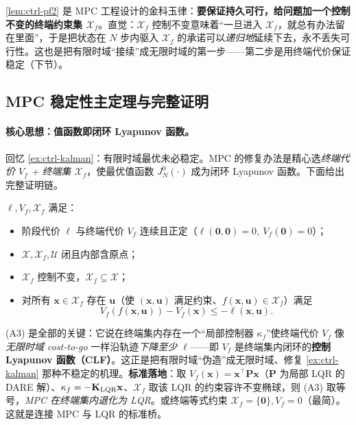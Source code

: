 \begin{insight}
\cref{lem:ctrl-pf2} 是 MPC 工程设计的金科玉律：\textbf{要保证持久可行，给问题加一个控制不变的终端约束集 $\mathcal{X}_f$}。直觉：$\mathcal{X}_f$ 控制不变意味着“一旦进入 $\mathcal{X}_f$，就总有办法留在里面”，于是把状态在 $N$ 步内驱入 $\mathcal{X}_f$ 的承诺可以\emph{递归地}延续下去，永不丢失可行性。这也是把有限时域“接续”成无限时域的第一步——第二步是用终端代价保证稳定（下节）。
\end{insight}

\subsection{MPC 稳定性主定理与完整证明}
\label{sec:ctrl-mpc-stability}

\paragraph{核心思想：值函数即闭环 Lyapunov 函数。}
回忆 \cref{ex:ctrl-kalman}：有限时域最优未必稳定。MPC 的修复办法是精心选\emph{终端代价 $V_f$ + 终端集 $\mathcal{X}_f$}，使最优值函数 $J_N^0(\cdot)$ 成为闭环 Lyapunov 函数\cite{rawlings2020mpc,borrelli2017predictive}。下面给出完整证明链。

\begin{definition}
\label{def:ctrl-mpc-asm}
$\ell,V_f,\mathcal{X}_f$ 满足\cite{rawlings2020mpc,borrelli2017predictive}：
\begin{itemize}
  \item[(A0)] 阶段代价 $\ell$ 与终端代价 $V_f$ 连续且正定（$\ell(\mathbf{0},\mathbf{0})=0,\ V_f(\mathbf{0})=0$）；
  \item[(A1)] $\mathcal{X},\mathcal{X}_f,\mathcal{U}$ 闭且内部含原点；
  \item[(A2)] $\mathcal{X}_f$ 控制不变，$\mathcal{X}_f\subseteq\mathcal{X}$；
  \item[(A3)（终端代价下降 / CLF 条件）] 对所有 $\mathbf{x}\in\mathcal{X}_f$ 存在 $\mathbf{u}$（使 $(\mathbf{x},\mathbf{u})$ 满足约束、$f(\mathbf{x},\mathbf{u})\in\mathcal{X}_f$）满足
  \begin{equation}
    V_f(f(\mathbf{x},\mathbf{u}))-V_f(\mathbf{x})\le-\ell(\mathbf{x},\mathbf{u}).
    \label{eq:ctrl-mpc-A3}
  \end{equation}
\end{itemize}
\end{definition}

\begin{insight}
(A3) 是全部的关键：它说在终端集内存在一个“局部控制器 $\kappa_f$”使终端代价 $V_f$ 像\emph{无限时域 cost-to-go} 一样沿轨迹\emph{下降至少 $\ell$}——即 $V_f$ 是终端集内闭环的\textbf{控制 Lyapunov 函数（CLF）}。这正是把有限时域“伪造”成无限时域、修复 \cref{ex:ctrl-kalman} 那种不稳定的机理。\textbf{标准落地}：取 $V_f(\mathbf{x})=\mathbf{x}^\top\mathbf{P}\mathbf{x}$（$\mathbf{P}$ 为局部 LQR 的 DARE 解）、$\kappa_f=-\mathbf{K}_{\rm LQR}\mathbf{x}$、$\mathcal{X}_f$ 取该 LQR 的约束容许不变椭球，则 (A3) 取等号，\emph{MPC 在终端集内退化为 LQR}。或终端等式约束 $\mathcal{X}_f=\{\mathbf{0}\},V_f=0$（最简）。这就是连接 MPC 与 LQR 的标准桥。
\end{insight}

